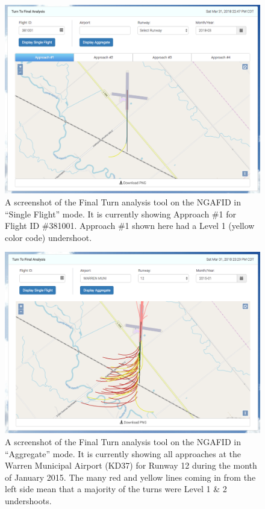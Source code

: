     	\begin{figure}
    		\centering
            \includegraphics[width=\linewidth]{img/single_ttf_screenshot}
            \caption{A screenshot of the Final Turn analysis tool on the NGAFID in ``Single Flight'' mode.  It is currently showing Approach \#1 for Flight ID \#381001.  Approach \#1 shown here had a Level 1 (yellow color code) undershoot.}
            \label{fig:single_ttf_screenshot}
    	\end{figure}
        
        \begin{figure}
    		\centering
            \includegraphics[width=\linewidth]{img/agg_ttf_screenshot}
            \caption{A screenshot of the Final Turn analysis tool on the NGAFID in ``Aggregate'' mode.  It is currently showing all approaches at the Warren Municipal Airport (KD37) for Runway 12 during the month of January 2015.  The many red and yellow lines coming in from the left side mean that a majority of the turns were Level 1 \& 2 undershoots.}
            \label{fig:agg_ttf_screenshot}
    	\end{figure}
    
